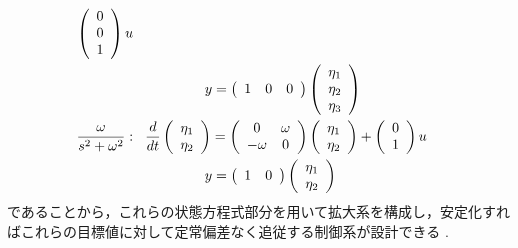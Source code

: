 \begin{frame}[t]
\begin{align}
  \left(\begin{array}{c}
         0 \\
         0 \\
   1
  \end{array}\right)
  u
  \notag \\ & \hspace*{18mm}
  y =
  \left(\begin{array}{ccc}
         1 & 0 & 0
  \end{array}\right)
  \left(\begin{array}{c}
         \eta_1 \\
         \eta_2 \\
   \eta_3
  \end{array}\right)
\\
\frac{\omega}{s^2+\omega^2}: & \hspace*{3mm}
 \frac{d}{dt}
  \left(\begin{array}{c}
         \eta_1 \\
   \eta_2
  \end{array}\right)
  =
  \left(\begin{array}{cc}
         0 & \omega \\
   -\omega & 0
  \end{array}\right)
  \left(\begin{array}{c}
         \eta_1 \\
   \eta_2
  \end{array}\right)
  +
  \left(\begin{array}{c}
         0 \\
   1
  \end{array}\right)
  u
  \notag \\ & \hspace*{18mm}
  y =
  \left(\begin{array}{cc}
         1 & 0
  \end{array}\right)
  \left(\begin{array}{c}
         \eta_1 \\
   \eta_2
  \end{array}\right)
\end{align}
であることから，これらの状態方程式部分を用いて拡大系を構成し，安定化すればこれらの目標値に対して定常偏差なく追従する制御系が設計できる
.
\end{frame}


